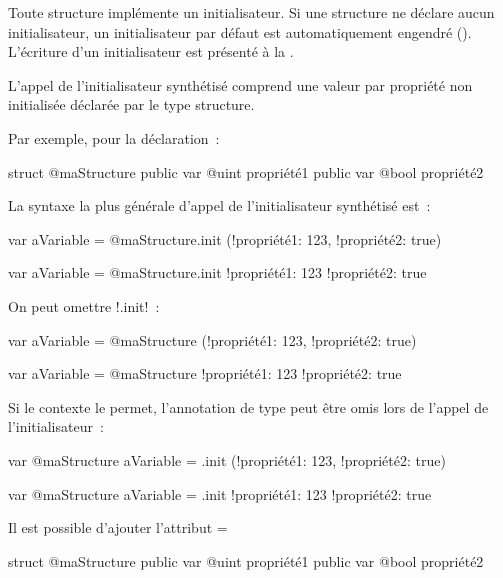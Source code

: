 Toute structure implémente un initialisateur. Si une structure ne déclare aucun initialisateur, un initialisateur par défaut est automatiquement engendré (). L'écriture d'un initialisateur est présenté à la .


L'appel de l'initialisateur synthétisé comprend une valeur par propriété non initialisée déclarée par le type structure.

Par exemple, pour la déclaration~:
\begin{galgas34}
struct @maStructure {
  public var @uint propriété1
  public var @bool propriété2
}
\end{galgas34}

La syntaxe la plus générale d'appel de l'initialisateur synthétisé est~:
\begin{galgas4}
var aVariable = @maStructure.init (!propriété1: 123, !propriété2: true)
\end{galgas4}
\begin{galgas3}
var aVariable = @maStructure.init {!propriété1: 123 !propriété2: true}
\end{galgas3}

On peut omettre \ggst!.init!~:
\begin{galgas4}
var aVariable = @maStructure (!propriété1: 123, !propriété2: true)
\end{galgas4}
\begin{galgas3}
var aVariable = @maStructure {!propriété1: 123 !propriété2: true}
\end{galgas3}


Si le contexte le permet, l'annotation de type peut être omis lors de l'appel de l'initialisateur~:
\begin{galgas4}
var @maStructure aVariable = .init (!propriété1: 123, !propriété2: true)
\end{galgas4}
\begin{galgas3}
var @maStructure aVariable = .init {!propriété1: 123 !propriété2: true}
\end{galgas3}


Il est possible d'ajouter l'attribut \ggst=%
\begin{galgas3}
struct @maStructure {
  public var @uint propriété1 %
  public var @bool propriété2
}
\end{galgas3}

